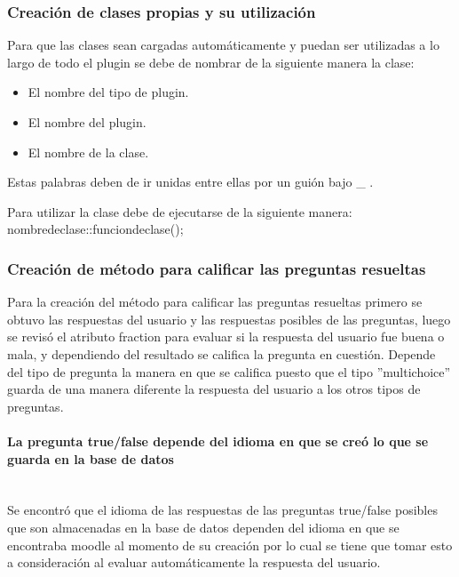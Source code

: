     \subsubsection{Creación de clases propias y su utilización}

		Para que las clases sean cargadas automáticamente y puedan ser utilizadas a lo largo de todo el plugin se debe de nombrar de la siguiente manera la clase:
    \begin{itemize}
      \item El nombre del tipo de plugin.
      \item El nombre del plugin.
      \item El nombre de la clase.
    \end{itemize}

		Estas palabras deben de ir unidas entre ellas por un guión bajo \_ .

    Para utilizar la clase debe de ejecutarse de la siguiente manera:\\
			nombredeclase::funciondeclase();

  \subsubsection{Creación de método para calificar las preguntas resueltas}

		Para la creación del método para calificar las preguntas resueltas primero se obtuvo las respuestas del usuario y las respuestas posibles de las preguntas, luego se revisó el atributo fraction para evaluar si la respuesta del usuario fue buena o mala, y dependiendo del resultado se califica la pregunta en cuestión.
		Depende del tipo de pregunta la manera en que se califica puesto que el tipo ''multichoice'' guarda de una manera diferente la respuesta del usuario a los otros tipos de preguntas.

    \paragraph{La pregunta true/false depende del idioma en que se creó lo que se guarda en la base de datos}\mbox{}\\

			Se encontró que el idioma de las respuestas de las preguntas true/false posibles que son almacenadas en la base de datos dependen del idioma en que se encontraba moodle al momento de su creación por lo cual se tiene que tomar esto a consideración al evaluar automáticamente la respuesta del usuario.


